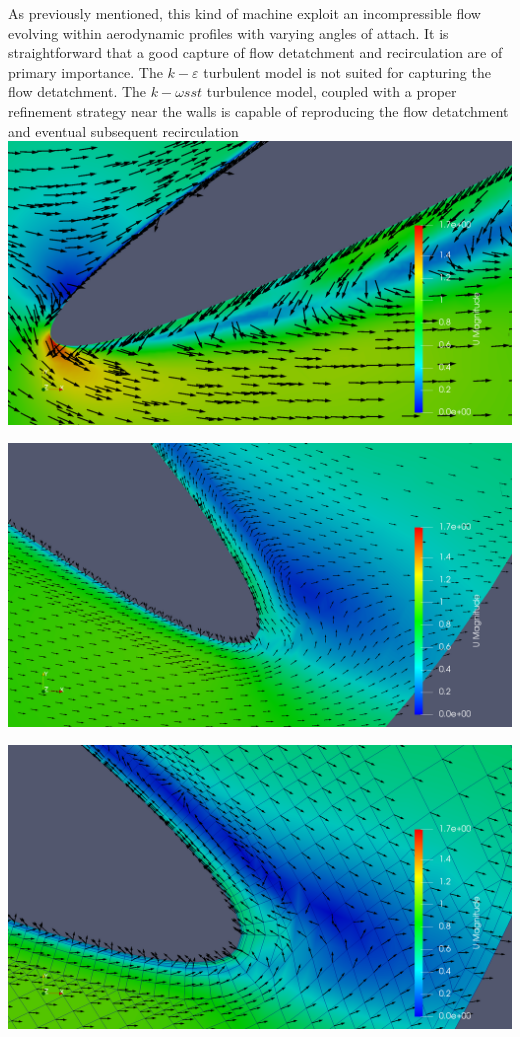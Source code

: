 \documentclass[a4paper,12pt]{article}
\begin{document}
As previously mentioned, this kind of machine exploit an incompressible flow evolving within aerodynamic profiles with varying angles of attach.
It is straightforward that a good capture of flow detatchment and recirculation are of primary importance.
The $k-\varepsilon$ turbulent model is not suited for capturing the flow detatchment.
The $k-\omega sst$ turbulence model, coupled with a proper refinement strategy near the walls is capable of reproducing the flow detatchment and eventual subsequent recirculation
\includegraphics[width=\textwidth]{images/turbulence/recirculation_scalarScaled.png}

\includegraphics[width=\textwidth]{images/turbulence/recirculation_scalarScaledGOODresolution.png}  

\includegraphics[width=\textwidth]{images/turbulence/recirculation_scalarScaledMESH.png} 
\end{document}
